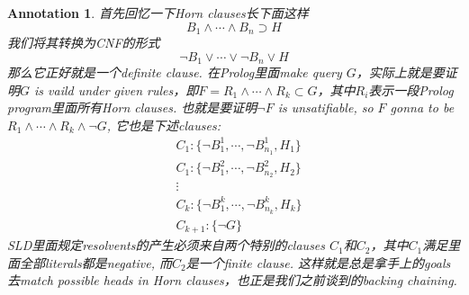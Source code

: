 \documentclass{article}
\theoremstyle{plain}
\newtheorem{annotation}[theorem]{Annotation}
\theoremstyle{nonumberplain}
\begin{document}
\begin{annotation}
\rm 首先回忆一下Horn clauses长下面这样
\[
	B_1 \wedge \cdots \wedge B_n \supset H
\]
我们将其转换为CNF的形式
\[
	\neg B_1 \vee \cdots \vee \neg B_n \vee H
\]
那么它正好就是一个definite clause. 在Prolog里面make query $G$，实际上就是要证明$G$ is vaild under given rules，即$F = R_1\wedge \cdots \wedge R_k \subset G$，其中$R_i$表示一段Prolog program里面所有Horn clauses. 也就是要证明$\neg F$ is unsatifiable,  so $F$ gonna to be $R_1 \wedge \cdots \wedge R_k \wedge \neg G$, 它也是下述clauses:
\[
	\begin{aligned}
	&C_1:\{\neg B_1^1, \cdots, \neg B_{n_1}^1, H_1\} \\
	&C_1:\{\neg B_1^2, \cdots, \neg B_{n_2}^2, H_2\} \\
	&\vdots \\
	&C_k:\{\neg B_1^k, \cdots, \neg B_{n_k}^k, H_k\} \\
	&C_{k+1}: \{\neg G\}
	\end{aligned}
\]
SLD里面规定resolvents的产生必须来自两个特别的clauses $C_1$和$C_2$，其中$C_1$满足里面全部literals都是negative, 而$C_2$是一个finite clause. 这样就是总是拿手上的goals去match possible heads in Horn clauses，也正是我们之前谈到的backing chaining. 
\end{annotation}
\end{document}
